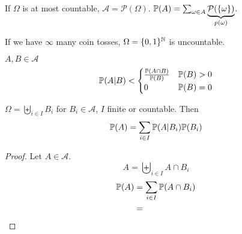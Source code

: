 \documentclass[mfit.tex]{subfiles}
\begin{document}

If $\Omega$ is at most countable, $\mathcal{A} = \mathcal{P}(\Omega)$. $\mathbb{P}(A) = \sum_{\omega \in A} \underbrace{\mathcal{P}(\{ \omega \})}_{p(\omega)}$.

If we have $\infty$ many coin tosses, $\Omega = \{ 0,1 \}^{\mathbb{N}}$ is uncountable.

\begin{defi*}
  $A,B \in \mathcal{A}$
  \[ \mathbb{P}(A | B) < \begin{cases} \frac{\mathbb{P}(A \cap B)}{\mathbb{P}(B)} & \mathbb{P}(B) > 0 \\ 0 & \mathbb{P}(B) = 0 \end{cases} \]
\end{defi*}

\begin{lemma*}
  $\Omega = \biguplus_{i \in I} B_i$ for $B_i \in \mathcal{A}$, $I$ finite or countable.
  Then 
  \[ \mathbb{P}(A) =  \sum_{i \in I} \mathbb{P}(A | B_i) \mathbb{P}(B_i) \]
\end{lemma*}

\begin{proof}
  Let $A \in \mathcal{A}$. 
  \[ A = \biguplus_{i \in I} A \cap B_i \]
  \begin{align*}
    \mathbb{P}(A) &= \sum_{i \in I} \mathbb{P}(A \cap B_i) \\
    &= 
  \end{align*}   
\end{proof}
\end{document}
